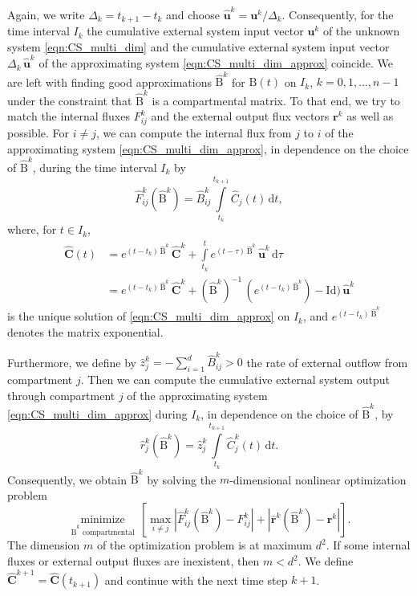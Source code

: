 \documentclass[11pt,a4paper]{article}
\renewcommand{\vec}[1]{\mathbf{#1}}
\newcommand{\tens}[1]{\mathrm{#1}}
\newcommand{\id}{\tens{Id}}
\newcommand{\dd}[1]{\,\mathrm{d}#1}
\newcommand{\intl}{\int\limits}
\begin{document}
        Again, we write $\Delta_k=t_{k+1}-t_k$ and choose $\widehat{\vec{u}}^k=\vec{u}^k/\Delta_k$.
        Consequently, for the time interval $I_k$ the cumulative external system input vector $\vec{u}^k$ of the unknown system \eqref{eqn:CS_multi_dim} and the cumulative external system input vector $\Delta_k\,\widehat{\vec{u}}^k$ of the approximating system \eqref{eqn:CS_multi_dim_approx} coincide.
        We are left with finding good approximations $\widehat{\tens{B}}^k$ for $\tens{B}(t)$ on $I_k$, $k=0,1,\ldots,n-1$ under the constraint that $\widehat{\tens{B}}^k$ is a compartmental matrix.
        To that end, we try to match the internal fluxes $F^k_{ij}$ and the external output flux vectors $\vec{r}^k$ as well as possible.
        For $i\neq j$, we can compute the internal flux from $j$ to $i$ of the approximating system \eqref{eqn:CS_multi_dim_approx}, in dependence on the choice of $\widehat{\tens{B}}^k$, during the time interval $I_k$ by
        \begin{equation*}
            \widehat{F}^k_{ij}(\widehat{\tens{B}}^k) = \widehat{B}^k_{ij}\intl_{t_k}^{t_{k+1}} \widehat{C}_j(t)\dd{t},
        \end{equation*}
        where, for $t\in I_k$,
        \begin{align*}
            \widehat{\vec{C}}(t) &= e^{(t-t_k)\,\widehat{\tens{B}}^k}\,\widehat{\vec{C}}^k + \intl_{t_k}^t e^{(t-\tau)\,\widehat{\tens{B}}^k}\,\widehat{\vec{u}}^k\dd{\tau}\\
            &= e^{(t-t_k)\,\widehat{\tens{B}}^k}\,\widehat{\vec{C}}^k + (\widehat{\tens{B}}^k)^{-1}\,(e^{(t-t_k)\,\widehat{\tens{B}}^k})-\id)\,\widehat{\vec{u}}^k
        \end{align*}
        is the unique solution of \eqref{eqn:CS_multi_dim_approx} on $I_k$, and $e^{(t-t_k)\,\widehat{\tens{B}}^k}$ denotes the matrix exponential.

        Furthermore, we define by $\widehat{z}^k_j=-\sum_{i=1}^d \widehat{B}^k_{ij}>0$ the rate of external outflow from compartment $j$.
        Then we can compute the cumulative external system output through compartment $j$ of the approximating system \eqref{eqn:CS_multi_dim_approx} during $I_k$, in dependence on the choice of $\widehat{\tens{B}}^k$, by
        \begin{equation*}
            \widehat{r}^k_j(\widehat{\tens{B}}^k) = \widehat{z}^k_j\intl_{t_k}^{t_{k+1}} \widehat{C}^k_j(t)\dd{t}.
        \end{equation*}
        Consequently, we obtain $\widehat{\tens{B}}^k$ by solving the $m$-dimensional nonlinear optimization problem
        \begin{equation*}
            \underset{\widehat{\tens{B}}^k\text{ compartmental}}{\operatorname{minimize}}\,\left[\max\limits_{i\neq j} |\widehat{F}^k_{ij}(\widehat{\tens{B}}^k)-F^k_{ij}| + |\widehat{\vec{r}}^k(\widehat{\tens{B}}^k)-\vec{r}^k|\right].
        \end{equation*}
        The dimension $m$ of the optimization problem is at maximum $d^2$.
        If some internal fluxes or external output fluxes are inexistent, then $m<d^2$.
        We define $\widehat{\vec{C}}^{k+1}=\widehat{\vec{C}}(t_{k+1})$ and continue with the next time step $k+1$.\\
       
\end{document}
